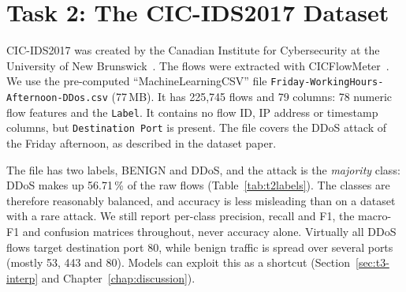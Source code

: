 \chapter{Task 2: The CIC-IDS2017 Dataset}\label{chap:task2_dataset}

CIC-IDS2017 was created by the Canadian Institute for Cybersecurity at the University of New Brunswick~\cite{sharafaldin2018cicids,cicids2017_web}. The flows were extracted with CICFlowMeter~\cite{lashkari2017cicflowmeter}. We use the pre-computed ``MachineLearningCSV'' file \texttt{Friday-WorkingHours-Afternoon-DDos.csv} (77\,MB). It has 225,745 flows and 79 columns: 78 numeric flow features and the \texttt{Label}. It contains no flow ID, IP address or timestamp columns, but \texttt{Destination Port} is present. The file covers the DDoS attack of the Friday afternoon, as described in the dataset paper.

The file has two labels, BENIGN and DDoS, and the attack is the \emph{majority} class: DDoS makes up 56.71\,\% of the raw flows (Table~\ref{tab:t2labels}). The classes are therefore reasonably balanced, and accuracy is less misleading than on a dataset with a rare attack. We still report per-class precision, recall and F1, the macro-F1 and confusion matrices throughout, never accuracy alone. Virtually all DDoS flows target destination port 80, while benign traffic is spread over several ports (mostly 53, 443 and 80). Models can exploit this as a shortcut (Section~\ref{sec:t3-interp} and Chapter~\ref{chap:discussion}).

\begin{table}[ht]
	\centering\small
	
	\caption{Label distribution of the Friday file, raw and after the cleaning steps of Chapter~\ref{chap:task3_preprocessing}.}
	\label{tab:t2labels}
\end{table}


\FloatBarrier
